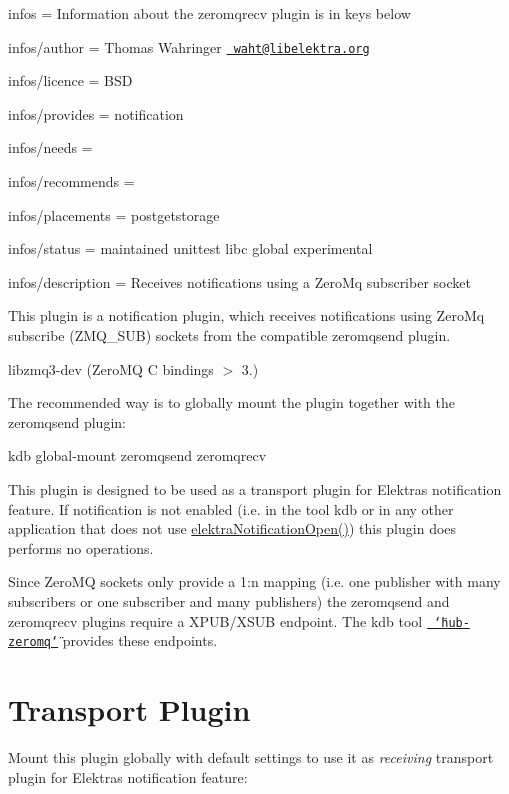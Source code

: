 
\begin{DoxyItemize}
\item infos = Information about the zeromqrecv plugin is in keys below
\item infos/author = Thomas Wahringer \href{mailto:waht@libelektra.org}{\texttt{ waht@libelektra.\+org}}
\item infos/licence = B\+SD
\item infos/provides = notification
\item infos/needs =
\item infos/recommends =
\item infos/placements = postgetstorage
\item infos/status = maintained unittest libc global experimental
\item infos/description = Receives notifications using a Zero\+Mq subscriber socket
\end{DoxyItemize}

This plugin is a notification plugin, which receives notifications using Zero\+Mq subscribe ({\ttfamily Z\+M\+Q\+\_\+\+S\+UB}) sockets from the compatible zeromqsend plugin.


\begin{DoxyItemize}
\item {\ttfamily libzmq3-\/dev} (Zero\+MQ C bindings $>$ 3.)
\end{DoxyItemize}

The recommended way is to globally mount the plugin together with the zeromqsend plugin\+: \begin{DoxyVerb}kdb global-mount zeromqsend zeromqrecv
\end{DoxyVerb}


This plugin is designed to be used as a transport plugin for Elektra\textquotesingle{}s notification feature. If notification is not enabled (i.\+e. in the tool {\ttfamily kdb} or in any other application that does not use {\ttfamily \mbox{\hyperlink{group__kdbnotification_gaeae96154abdb5fdbf1b34a01e2b23e44}{elektra\+Notification\+Open()}}}) this plugin does performs no operations.

Since Zero\+MQ sockets only provide a 1\+:n mapping (i.\+e. one publisher with many subscribers or one subscriber and many publishers) the {\ttfamily zeromqsend} and {\ttfamily zeromqrecv} plugins require a X\+P\+U\+B/\+X\+S\+UB endpoint. The kdb tool \href{https://www.libelektra.org/tools/hub-zeromq}{\texttt{ \char`\"{}hub-\/zeromq\char`\"{}}} provides these endpoints.\hypertarget{autotoc_md904_autotoc_md907}{}\section{Transport Plugin}\label{autotoc_md904_autotoc_md907}
Mount this plugin globally with default settings to use it as {\itshape receiving} transport plugin for Elektra\textquotesingle{}s notification feature\+:

